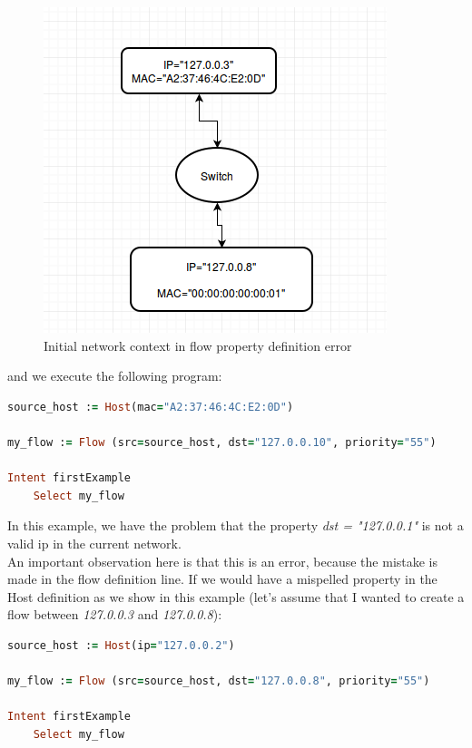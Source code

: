 \begin{figure}[H]
\centering
\includegraphics[width=\textwidth]{images/haikunet/error_scenario_1.png}
\caption{Initial network context in flow property definition error}
\end{figure}

and we execute the following program:

\begin{lstlisting}[language=Ruby,breaklines=true]
source_host := Host(mac="A2:37:46:4C:E2:0D")

my_flow := Flow (src=source_host, dst="127.0.0.10", priority="55")

Intent firstExample
    Select my_flow
\end{lstlisting}

In this example, we have the problem that the property \textit{dst = "127.0.0.1"} is not a valid ip in the current network. \\

An important observation here is that this is an error, because the mistake is made in the flow definition line. If we would have a mispelled property in the Host definition as we show in this example (let's assume that I wanted to create a flow between \textit{127.0.0.3} and \textit{127.0.0.8}):

\begin{lstlisting}[language=Ruby,breaklines=true]
source_host := Host(ip="127.0.0.2")

my_flow := Flow (src=source_host, dst="127.0.0.8", priority="55")

Intent firstExample
    Select my_flow
\end{lstlisting}


